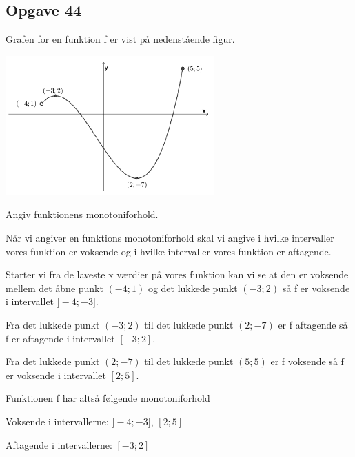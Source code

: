 \subsection{Opgave 44}

Grafen for en funktion f er vist på nedenstående figur.

\includegraphics[width=8cm]{Opgave_41-50/Opgave_44/44.png}

Angiv funktionens monotoniforhold.

\ans

Når vi angiver en funktions monotoniforhold skal vi angive i hvilke intervaller vores funktion er voksende
og i hvilke intervaller vores funktion er aftagende.

Starter vi fra de laveste x værdier på vores funktion kan vi se at den er voksende mellem det åbne punkt $(-4; 1)$ og det lukkede punkt $(-3; 2)$ så f er voksende i intervallet
$\rbrack -4; -3 \rbrack$.

Fra det lukkede punkt $(-3; 2)$ til det lukkede punkt $(2; -7)$ er f aftagende så f er aftagende i intervallet
$[-3; 2]$.

Fra det lukkede punkt $(2; -7)$ til det lukkede punkt $(5; 5)$ er f voksende så f er voksende i intervallet $[2; 5]$.

Funktionen f har altså følgende monotoniforhold

Voksende i intervallerne: $\rbrack -4; -3\rbrack$, $[2; 5]$

Aftagende i intervallerne: $[-3; 2]$